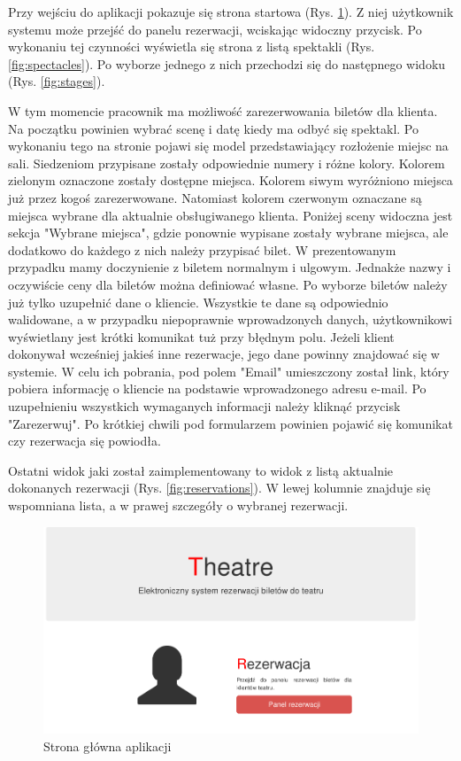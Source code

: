 \documentclass{mgr}
\begin{document}
Przy wejściu do aplikacji pokazuje się strona startowa (Rys. \ref{fig:main-page}). Z niej użytkownik systemu może przejść do panelu rezerwacji, wciskając widoczny przycisk. Po wykonaniu tej czynności wyświetla się strona z listą spektakli (Rys. \ref{fig:spectacles}). Po wyborze jednego z nich przechodzi się do następnego widoku (Rys. \ref{fig:stages}). 

W tym momencie pracownik ma możliwość zarezerwowania biletów dla klienta. Na początku powinien wybrać scenę i datę kiedy ma odbyć się spektakl. Po wykonaniu tego na stronie pojawi się model przedstawiający rozłożenie miejsc na sali. Siedzeniom przypisane zostały odpowiednie numery i różne kolory. Kolorem zielonym oznaczone zostały dostępne miejsca. Kolorem siwym wyróżniono miejsca już przez kogoś zarezerwowane. Natomiast kolorem czerwonym oznaczane są miejsca wybrane dla aktualnie obsługiwanego klienta. Poniżej sceny widoczna jest sekcja "Wybrane miejsca", gdzie ponownie wypisane zostały wybrane miejsca, ale dodatkowo do każdego z nich należy przypisać bilet. W prezentowanym przypadku mamy doczynienie z biletem normalnym i ulgowym. Jednakże nazwy i oczywiście ceny dla biletów można definiować własne. Po wyborze biletów należy już tylko uzupełnić dane o kliencie. Wszystkie te dane są odpowiednio walidowane, a w przypadku niepoprawnie wprowadzonych danych, użytkownikowi wyświetlany jest krótki komunikat tuż przy błędnym polu. Jeżeli klient dokonywał wcześniej jakieś inne rezerwacje, jego dane powinny znajdować się w systemie. W celu ich pobrania, pod polem "Email" umieszczony został link, który pobiera informację o kliencie na podstawie wprowadzonego adresu e-mail. Po uzupełnieniu wszystkich wymaganych informacji należy kliknąć przycisk "Zarezerwuj". Po krótkiej chwili pod formularzem powinien pojawić się komunikat czy rezerwacja się powiodła. 

Ostatni widok jaki został zaimplementowany to widok z listą aktualnie dokonanych rezerwacji (Rys. \ref{fig:reservations}). W lewej kolumnie znajduje się wspomniana lista, a w prawej szczegóły o wybranej rezerwacji.


\begin{figure}[!ht]
	\centering
	\includegraphics[width=\textwidth]{images/main_page.png}
	\caption{Strona główna aplikacji}
	\label{fig:main-page}
\end{figure}
\end{document}
